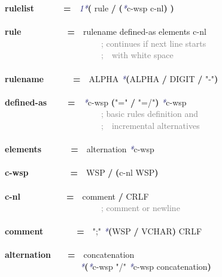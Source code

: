 \documentclass{article}
\begin{document}
{\footnotesize\ttfamily
\textbf{rulelist}\mbox{~~~~~~~}\textbf{=}\mbox{~~}\textcolor{MidnightBlue}{\emph{1*}}\textbf{(} rule \textbf{/} \textbf{(}\textcolor{MidnightBlue}{\emph{*}}c-{}wsp c-{}nl\textbf{)} \textbf{)}\\
\\
\textbf{rule}\mbox{~~~~~~~~~~~}\textbf{=}\mbox{~~}rulename defined-{}as elements c-{}nl\\
\mbox{~~~~~~~~~~~~~~~~~~~~~~~}\textcolor{Gray}{; continues if next line starts}\\
\mbox{~~~~~~~~~~~~~~~~~~~~~~~}\textcolor{Gray}{;\mbox{~~}with white space}\\
\\
\textbf{rulename}\mbox{~~~~~~~}\textbf{=}\mbox{~~}ALPHA \textcolor{MidnightBlue}{\emph{*}}\textbf{(}ALPHA \textbf{/} DIGIT \textbf{/} \textcolor{BrickRed}{"-{}"}\textbf{)}\\
\\
\textbf{defined-{}as}\mbox{~~~~~}\textbf{=}\mbox{~~}\textcolor{MidnightBlue}{\emph{*}}c-{}wsp \textbf{(}\textcolor{BrickRed}{"="} \textbf{/} \textcolor{BrickRed}{"=/"}\textbf{)} \textcolor{MidnightBlue}{\emph{*}}c-{}wsp\\
\mbox{~~~~~~~~~~~~~~~~~~~~~~~}\textcolor{Gray}{; basic rules definition and}\\
\mbox{~~~~~~~~~~~~~~~~~~~~~~~}\textcolor{Gray}{;\mbox{~~}incremental alternatives}\\
\\
\textbf{elements}\mbox{~~~~~~~}\textbf{=}\mbox{~~}alternation \textcolor{MidnightBlue}{\emph{*}}c-{}wsp\\
\\
\textbf{c-{}wsp}\mbox{~~~~~~~~~~}\textbf{=}\mbox{~~}WSP \textbf{/} \textbf{(}c-{}nl WSP\textbf{)}\\
\\
\textbf{c-{}nl}\mbox{~~~~~~~~~~~}\textbf{=}\mbox{~~}comment \textbf{/} CRLF\\
\mbox{~~~~~~~~~~~~~~~~~~~~~~~}\textcolor{Gray}{; comment or newline}\\
\\
\textbf{comment}\mbox{~~~~~~~~}\textbf{=}\mbox{~~}\textcolor{BrickRed}{";"} \textcolor{MidnightBlue}{\emph{*}}\textbf{(}WSP \textbf{/} VCHAR\textbf{)} CRLF\\
\\
\textbf{alternation}\mbox{~~~~}\textbf{=}\mbox{~~}concatenation\\
\mbox{~~~~~~~~~~~~~~~~~~}\textcolor{MidnightBlue}{\emph{*}}\textbf{(}\textcolor{MidnightBlue}{\emph{*}}c-{}wsp \textcolor{BrickRed}{"/"} \textcolor{MidnightBlue}{\emph{*}}c-{}wsp concatenation\textbf{)}\\
}
\end{document}

